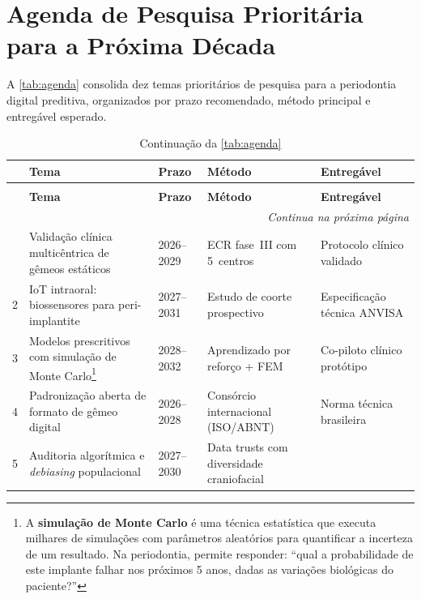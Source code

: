 \section{Agenda de Pesquisa Prioritária para a Próxima Década}

A \autoref{tab:agenda} consolida dez temas prioritários de pesquisa
para a periodontia digital preditiva, organizados por prazo
recomendado, método principal e entregável esperado.

\begin{longtable}{p{0.5cm}p{3.2cm}p{1.8cm}p{2.5cm}p{3.5cm}}
    \caption{Agenda de pesquisa prioritária: temas, prazos,
             métodos e entregáveis.}
    \label{tab:agenda} \\
    \toprule
    & \textbf{Tema} &
    \textbf{Prazo} &
    \textbf{Método} &
    \textbf{Entregável} \\
    \midrule
    \endfirsthead
    \caption*{Continuação da \autoref{tab:agenda}} \\
    \toprule
    & \textbf{Tema} &
    \textbf{Prazo} &
    \textbf{Método} &
    \textbf{Entregável} \\
    \midrule
    \endhead
    \midrule
    \multicolumn{5}{r}{\footnotesize\textit{Continua na próxima página}} \\
    \endfoot
    \bottomrule
    \endlastfoot
    1
    & Validação clínica multicêntrica de gêmeos estáticos
    & 2026--2029
    & ECR fase~III com 5~centros
    & Protocolo clínico validado \\
    2
    & IoT intraoral: biossensores para peri-implantite
    & 2027--2031
    & Estudo de coorte prospectivo
    & Especificação técnica ANVISA \\
    3
    & Modelos prescritivos com simulação de Monte Carlo\footnote{A
        \textbf{simulação de Monte Carlo} é uma técnica estatística
        que executa milhares de simulações com parâmetros
        aleatórios para quantificar a incerteza de um resultado. Na
        periodontia, permite responder: ``qual a probabilidade de
        este implante falhar nos próximos 5 anos, dadas as
        variações biológicas do paciente?''}
    & 2028--2032
    & Aprendizado por reforço + FEM
    & Co-piloto clínico protótipo \\
    4
    & Padronização aberta de formato de gêmeo digital
    & 2026--2028
    & Consórcio internacional (ISO/ABNT)
    & Norma técnica brasileira \\
    5
    & Auditoria algorítmica e \textit{debiasing} populacional
    & 2027--2030
    & Data trusts com diversidade craniofacial

\end{longtable}

